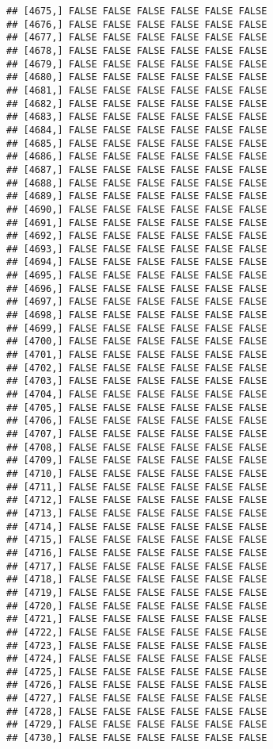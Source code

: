 \documentclass[
]{article}
\begin{document}
\begin{verbatim}
## [4675,] FALSE FALSE FALSE FALSE FALSE FALSE
## [4676,] FALSE FALSE FALSE FALSE FALSE FALSE
## [4677,] FALSE FALSE FALSE FALSE FALSE FALSE
## [4678,] FALSE FALSE FALSE FALSE FALSE FALSE
## [4679,] FALSE FALSE FALSE FALSE FALSE FALSE
## [4680,] FALSE FALSE FALSE FALSE FALSE FALSE
## [4681,] FALSE FALSE FALSE FALSE FALSE FALSE
## [4682,] FALSE FALSE FALSE FALSE FALSE FALSE
## [4683,] FALSE FALSE FALSE FALSE FALSE FALSE
## [4684,] FALSE FALSE FALSE FALSE FALSE FALSE
## [4685,] FALSE FALSE FALSE FALSE FALSE FALSE
## [4686,] FALSE FALSE FALSE FALSE FALSE FALSE
## [4687,] FALSE FALSE FALSE FALSE FALSE FALSE
## [4688,] FALSE FALSE FALSE FALSE FALSE FALSE
## [4689,] FALSE FALSE FALSE FALSE FALSE FALSE
## [4690,] FALSE FALSE FALSE FALSE FALSE FALSE
## [4691,] FALSE FALSE FALSE FALSE FALSE FALSE
## [4692,] FALSE FALSE FALSE FALSE FALSE FALSE
## [4693,] FALSE FALSE FALSE FALSE FALSE FALSE
## [4694,] FALSE FALSE FALSE FALSE FALSE FALSE
## [4695,] FALSE FALSE FALSE FALSE FALSE FALSE
## [4696,] FALSE FALSE FALSE FALSE FALSE FALSE
## [4697,] FALSE FALSE FALSE FALSE FALSE FALSE
## [4698,] FALSE FALSE FALSE FALSE FALSE FALSE
## [4699,] FALSE FALSE FALSE FALSE FALSE FALSE
## [4700,] FALSE FALSE FALSE FALSE FALSE FALSE
## [4701,] FALSE FALSE FALSE FALSE FALSE FALSE
## [4702,] FALSE FALSE FALSE FALSE FALSE FALSE
## [4703,] FALSE FALSE FALSE FALSE FALSE FALSE
## [4704,] FALSE FALSE FALSE FALSE FALSE FALSE
## [4705,] FALSE FALSE FALSE FALSE FALSE FALSE
## [4706,] FALSE FALSE FALSE FALSE FALSE FALSE
## [4707,] FALSE FALSE FALSE FALSE FALSE FALSE
## [4708,] FALSE FALSE FALSE FALSE FALSE FALSE
## [4709,] FALSE FALSE FALSE FALSE FALSE FALSE
## [4710,] FALSE FALSE FALSE FALSE FALSE FALSE
## [4711,] FALSE FALSE FALSE FALSE FALSE FALSE
## [4712,] FALSE FALSE FALSE FALSE FALSE FALSE
## [4713,] FALSE FALSE FALSE FALSE FALSE FALSE
## [4714,] FALSE FALSE FALSE FALSE FALSE FALSE
## [4715,] FALSE FALSE FALSE FALSE FALSE FALSE
## [4716,] FALSE FALSE FALSE FALSE FALSE FALSE
## [4717,] FALSE FALSE FALSE FALSE FALSE FALSE
## [4718,] FALSE FALSE FALSE FALSE FALSE FALSE
## [4719,] FALSE FALSE FALSE FALSE FALSE FALSE
## [4720,] FALSE FALSE FALSE FALSE FALSE FALSE
## [4721,] FALSE FALSE FALSE FALSE FALSE FALSE
## [4722,] FALSE FALSE FALSE FALSE FALSE FALSE
## [4723,] FALSE FALSE FALSE FALSE FALSE FALSE
## [4724,] FALSE FALSE FALSE FALSE FALSE FALSE
## [4725,] FALSE FALSE FALSE FALSE FALSE FALSE
## [4726,] FALSE FALSE FALSE FALSE FALSE FALSE
## [4727,] FALSE FALSE FALSE FALSE FALSE FALSE
## [4728,] FALSE FALSE FALSE FALSE FALSE FALSE
## [4729,] FALSE FALSE FALSE FALSE FALSE FALSE
## [4730,] FALSE FALSE FALSE FALSE FALSE FALSE

\end{verbatim}
\end{document}
